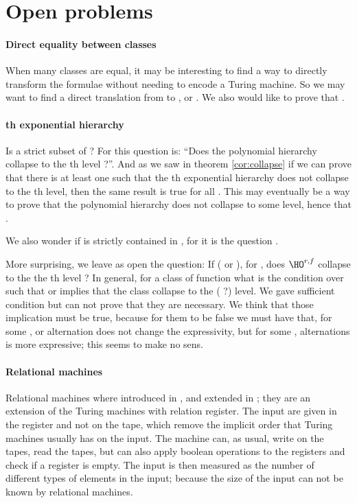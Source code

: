 \documentclass[a4paper,12pt]{article}
\theoremstyle{definition}
\newcommand{\hod}[2]{\ensuremath{\HO^{#1,#2}}}
\newcommand{\eh}[1]{th exponential hierarchy}
\begin{document}
\section{Open problems}\label{open}

\paragraph{Direct equality between classes}
When many classes are equal, it may be interesting to find a way to
directly transform the formulae without needing to encode a Turing
machine. So we may want to find a direct translation from  to ,  or . We
also would like to prove that .


\paragraph{\eh r}Is  a strict subset of  ?
For  this question is: ``Does the polynomial hierarchy collapse
to the th level ?''. And as we saw in theorem \ref{cor:collapse} if
we can prove that there is at least one  such that the \eh r does
not collapse to the th level, then the same result is true for all
. This may eventually be a way to prove that the polynomial
hierarchy does not collapse to some level, hence that .

We also wonder if  is strictly contained in
, for  it is the question .

More surprising, we leave as open the question: If ( or ), for , does \hod rf collapse to
the the th level ? In general, for a class of function  what is
the condition over  such that  or
 implies that the class 
collapse to the ( ?) level. We gave sufficient condition but
can not prove that they are necessary. We think that those implication
must be true, because for them to be false we must have that, for some
,  or  alternation does not change the expressivity, but 
for some ,  alternations is more expressive; this seems to make
no sens.

\paragraph{Relational machines}

Relational machines where introduced in \cite{AbVi}, and extended in
\cite{nfp}; they are an extension of the Turing machines with relation
register. The input are given in the register and not on the tape,
which remove the implicit order that Turing machines usually has on
the input. The machine can, as usual, write on the tapes, read the
tapes, but can also apply boolean operations to the registers and
check if a register is empty. The input is then measured as the number
of different types of elements in the input; because the size of the
input can not be known by relational machines.
\end{document}
